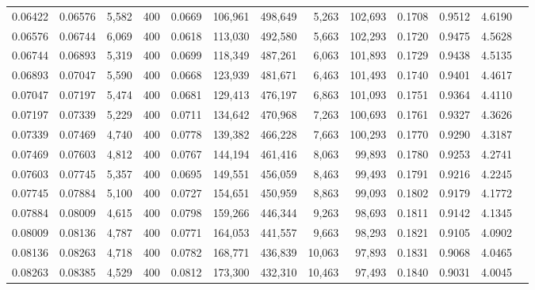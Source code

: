 \begin{tabular}{rrrrrrrrrrrrr}
0.06422 & 0.06576 &  5,582 & 400 &                                     0.0669 & 106,961 & 498,649 &   5,263 & 102,693 & 0.1708 & 0.9512 & 4.6190 \\
0.06576 & 0.06744 &  6,069 & 400 &                                     0.0618 & 113,030 & 492,580 &   5,663 & 102,293 & 0.1720 & 0.9475 & 4.5628 \\
0.06744 & 0.06893 &  5,319 & 400 &                                     0.0699 & 118,349 & 487,261 &   6,063 & 101,893 & 0.1729 & 0.9438 & 4.5135 \\
0.06893 & 0.07047 &  5,590 & 400 &                                     0.0668 & 123,939 & 481,671 &   6,463 & 101,493 & 0.1740 & 0.9401 & 4.4617 \\
0.07047 & 0.07197 &  5,474 & 400 &                                     0.0681 & 129,413 & 476,197 &   6,863 & 101,093 & 0.1751 & 0.9364 & 4.4110 \\
0.07197 & 0.07339 &  5,229 & 400 &                                     0.0711 & 134,642 & 470,968 &   7,263 & 100,693 & 0.1761 & 0.9327 & 4.3626 \\
0.07339 & 0.07469 &  4,740 & 400 &                                     0.0778 & 139,382 & 466,228 &   7,663 & 100,293 & 0.1770 & 0.9290 & 4.3187 \\
0.07469 & 0.07603 &  4,812 & 400 &                                     0.0767 & 144,194 & 461,416 &   8,063 &  99,893 & 0.1780 & 0.9253 & 4.2741 \\
0.07603 & 0.07745 &  5,357 & 400 &                                     0.0695 & 149,551 & 456,059 &   8,463 &  99,493 & 0.1791 & 0.9216 & 4.2245 \\
0.07745 & 0.07884 &  5,100 & 400 &                                     0.0727 & 154,651 & 450,959 &   8,863 &  99,093 & 0.1802 & 0.9179 & 4.1772 \\
0.07884 & 0.08009 &  4,615 & 400 &                                     0.0798 & 159,266 & 446,344 &   9,263 &  98,693 & 0.1811 & 0.9142 & 4.1345 \\
0.08009 & 0.08136 &  4,787 & 400 &                                     0.0771 & 164,053 & 441,557 &   9,663 &  98,293 & 0.1821 & 0.9105 & 4.0902 \\
0.08136 & 0.08263 &  4,718 & 400 &                                     0.0782 & 168,771 & 436,839 &  10,063 &  97,893 & 0.1831 & 0.9068 & 4.0465 \\
0.08263 & 0.08385 &  4,529 & 400 &                                     0.0812 & 173,300 & 432,310 &  10,463 &  97,493 & 0.1840 & 0.9031 & 4.0045 \\

\end{tabular}
